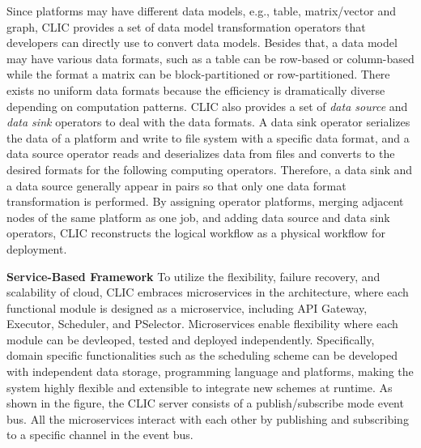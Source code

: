 Since platforms may have different data models, e.g., table, matrix/vector and graph, CLIC provides a set of data model transformation operators that developers can directly use to convert data models.
Besides that, a data model may have various data formats, such as a table can be row-based or column-based while the format a matrix can be block-partitioned or row-partitioned.
There exists no uniform data formats because the efficiency is dramatically diverse depending on computation patterns.
CLIC also provides a set of \textit{data source} and \textit{data sink} operators to deal with the data formats. A data sink operator serializes the data of a platform and write to file system with a specific data format, and a data source operator reads and deserializes data from files and converts to the desired formats for the following computing operators. Therefore, a data sink and a data source generally appear in pairs so that only one data format transformation is performed. 
By assigning operator platforms, merging adjacent nodes of the same platform as one job, and adding data source and data sink operators, CLIC reconstructs the logical workflow as a physical workflow for deployment.


 
\textbf{Service-Based Framework} To utilize the flexibility, failure recovery, and scalability of cloud, CLIC embraces microservices in the architecture, where each functional module is designed as a microservice, including API Gateway, Executor, Scheduler, and PSelector.
Microservices enable flexibility where each module can be devleoped, tested and deployed independently.
Specifically, domain specific functionalities such as the scheduling scheme can be developed with independent data storage, programming language and platforms, making the system highly flexible and extensible to integrate new schemes at runtime.
As shown in the figure, the CLIC server consists of a publish/subscribe mode event bus. All the microservices interact with each other by publishing and subscribing to a specific channel in the event bus.

